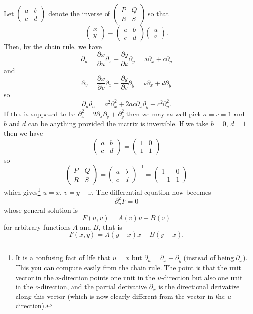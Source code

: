 \documentclass[12pt]{article}
\begin{document}
\begin{answer}
Let $\left(\begin{array}{cc}a & b \\ c & d\end{array}\right)$ denote the inverse of $\left(\begin{array}{cc}P & Q \\ R & S\end{array}\right)$ so that
\[\left(\begin{array}{c}x \\ y \end{array}\right)=\left(\begin{array}{cc}a & b \\ c & d\end{array}\right)\left(\begin{array}{c}u \\ v\end{array}\right).\]
Then, by the chain rule, we have
\[\partial_u=\frac{\partial x}{\partial u}\partial_x+\frac{\partial y}{\partial u}\partial_y=a\partial_x+c\partial_y\]
and
\[\partial_v=\frac{\partial x}{\partial v}\partial_x+\frac{\partial y}{\partial v}\partial_y=b\partial_x+d\partial_y\]
so
\[\partial_u\partial_u=a^2\partial_x^2+2ac\partial_x\partial_y+c^2\partial_y^2.\]
If this is supposed to be $\partial_x^2+2\partial_x\partial_y+\partial_y^2$ then we may as well pick $a=c=1$ and $b$ and $d$ can be anything provided the matrix is invertible. If we take $b=0$, $d=1$ then we have
\[\left(\begin{array}{cc}a & b \\ c & d\end{array}\right)=\left(\begin{array}{cc}1 & 0 \\ 1 & 1\end{array}\right)\]
so
\[\left(\begin{array}{cc}P & Q \\ R & S\end{array}\right)=\left(\begin{array}{cc}a & b \\ c & d\end{array}\right)^{-1}=\left(\begin{array}{cc}1 & 0 \\ -1 & 1\end{array}\right)\]
which gives\footnote{It is a confusing fact of life that $u=x$ but $\partial_u=\partial_x+\partial_y$ (instead of being $\partial_x$). This you can compute easily from the chain rule. The point is that the unit vector in the $x$-direction points one unit in the $u$-direction but also one unit in the $v$-direction, and the partial derivative $\partial_x$ is the directional derivative along this vector (which is now clearly different from the vector in the $u$-direction).} $u=x$, $v=y-x$. The differential equation now becomes
\[\partial_u^2F=0\]
whose general solution is
\[F(u,v)=A(v)u+B(v)\]
for arbitrary functions $A$ and $B$, that is
\[F(x,y)=A(y-x)x+B(y-x).\]
\end{answer}
\newpage
\end{document}

